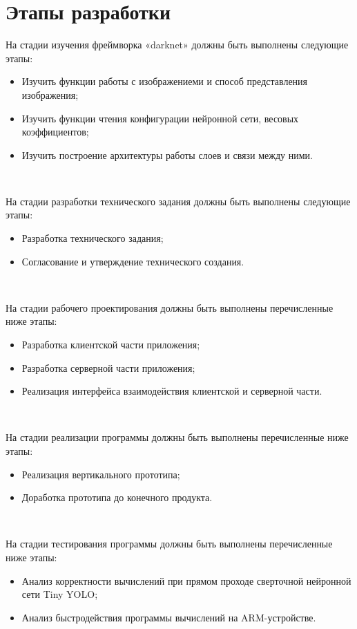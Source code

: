\documentclass[a4paper,english]{G2-105}
\begin{document}
\section{Этапы разработки}
\par На стадии изучения фреймворка «darknet» должны быть
выполнены следующие этапы:
\begin{itemize}
\item Изучить функции работы с изображениеми и способ
представления изображения;
\item Изучить функции чтения конфигурации нейронной сети,
весовых коэффициентов;
\item Изучить построение архитектуры работы слоев и связи между
ними.
\end{itemize}
~\                    
\par На стадии разработки технического задания должны быть
выполнены следующие этапы:
\begin{itemize}
\item Разработка технического задания;
\item Согласование и утверждение технического создания.
\end{itemize}
~\ 
\par На стадии рабочего проектирования должны быть выполнены
перечисленные ниже этапы:
\begin{itemize}
\item Разработка клиентской части приложения;
\item Разработка серверной части приложения;
\item Реализация интерфейса взаимодействия клиентской и серверной части.
\end{itemize}
~\ 
\par На стадии реализации программы должны быть выполнены
перечисленные ниже этапы:
\begin{itemize}
\item Реализация вертикального прототипа;
\item Доработка прототипа до конечного продукта.
\end{itemize}
~\ 
\par На стадии тестирования программы должны быть выполнены
перечисленные ниже этапы:
\begin{itemize}
\item Анализ корректности вычислений при прямом проходе сверточной нейронной сети Tiny YOLO;
\item Анализ быстродействия программы вычислений на ARM-устройстве.
\end{itemize}
\end{document}
